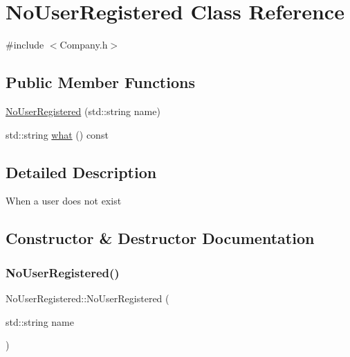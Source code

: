 \hypertarget{class_no_user_registered}{}\section{No\+User\+Registered Class Reference}
\label{class_no_user_registered}


{\ttfamily \#include $<$Company.\+h$>$}

\subsection*{Public Member Functions}
\begin{DoxyCompactItemize}
\item 
\mbox{\hyperlink{class_no_user_registered_a928e78029870899c7dceeb95be5ed1d9}{No\+User\+Registered}} (std\+::string name)
\item 
std\+::string \mbox{\hyperlink{class_no_user_registered_a07aae9e65baf017e03fbe3445ff5ec37}{what}} () const
\end{DoxyCompactItemize}


\subsection{Detailed Description}
When a user does not exist 

\subsection{Constructor \& Destructor Documentation}
\mbox{\label{class_no_user_registered_a928e78029870899c7dceeb95be5ed1d9}} 
\subsubsection{\texorpdfstring{No\+User\+Registered()}{NoUserRegistered()}}
{\footnotesize\ttfamily No\+User\+Registered\+::\+No\+User\+Registered (\begin{DoxyParamCaption}\item[{std\+::string}]{name }\end{DoxyParamCaption})\hspace{0.3cm}{\ttfamily [inline]}}



